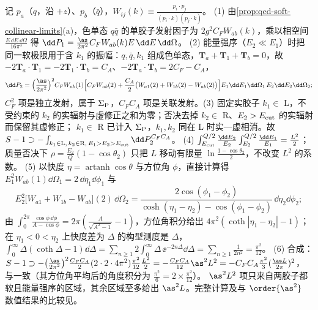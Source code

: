 \begin{proofsketch}
记 $p_a$（$q$，沿 $+z$）、$p_b$（$\bar q$），$W_{ij}(k)\equiv\frac{p_i\cdot p_j}{(p_i\cdot k)(p_j\cdot k)}$。
(1) 由\cref{prop:qcd-soft-collinear-limits}(a)，色单态 $q\bar q$ 的单胶子发射因子为 $2g^2C_FW_{ab}(k)$，乘以相空间 $\frac{E\,\dd E\,\dd\Omega}{16\pi^3}$ 得 $\dd P_1=\frac{\as}{2\pi^2}C_FW_{ab}(k)E\,\dd E\,\dd\Omega$。
(2) 能量强序（$E_2\ll E_1$）时把同一软极限用于含 $k_1$ 的振幅：$q,\bar q,k_1$ 组成色单态，$\bm T_a+\bm T_1+\bm T_b=0$，故 $-2\bm T_a\cdot\bm T_1=-2\bm T_1\cdot\bm T_b=C_A$、$-2\bm T_a\cdot\bm T_b=2C_F-C_A$，
\[
\dd P_2=\Big(\frac{\as}{2\pi^2}\Big)^2C_FW_{ab}(1)\Big[C_FW_{ab}(2)+\frac{C_A}{2}\big(W_{a1}(2)+W_{1b}(2)-W_{ab}(2)\big)\Big]E_1\dd E_1\dd\Omega_1\,E_2\dd E_2\dd\Omega_2 ;
\]
$C_F^2$ 项是独立发射，属于 $\Sigma_{\rm P}$，$C_FC_A$ 项是关联发射。(3) 固定实胶子 $k_1\in$ L，不受约束的 $k_2$ 的实辐射与虚修正之和为零；否决去掉 $k_2\in$ R、$E_2>E_{\rm cut}$ 的实辐射而保留其虚修正；
$k_1\in$ R 已计入 $\Sigma_{\rm P}$，$k_1,k_2$ 同在 L 时实—虚相消。故 $S-1\supset-\int_{k_1\in{\rm L},\,k_2\in{\rm R},\,E_1>E_2>E_{\rm cut}}\dd P_2^{C_FC_A}$。
(4) $\int_{E_{\rm cut}}^{Q/2}\frac{\dd E_2}{E_2}\int_{E_2}^{Q/2}\frac{\dd E_1}{E_1}=\frac{L^2}{2}$；质量否决下 $\rho=\frac{E_2}{Q}(1-\cos\theta_2)$ 只把 $L$ 移动有限量 $\ln\frac{1-\cos\theta_2}{2}$，不改变 $L^2$ 的系数。
(5) 以快度 $\eta=\operatorname{artanh}\cos\theta$ 与方位角 $\phi$，直接计算得 $E_1^2W_{ab}(1)\dd\Omega_1=2\,\dd\eta_1\dd\phi_1$ 与
\[
E_2^2\big[W_{a1}+W_{1b}-W_{ab}\big](2)\,\dd\Omega_2=\frac{2\cos(\phi_1-\phi_2)}{\cosh(\eta_1-\eta_2)-\cos(\phi_1-\phi_2)}\,\dd\eta_2\dd\phi_2 ;
\]
由 $\int_0^{2\pi}\frac{\cos\phi\,\dd\phi}{A-\cos\phi}=2\pi(\frac{A}{\sqrt{A^2-1}}-1)$，方位角积分给出 $4\pi^2(\coth|\eta_1-\eta_2|-1)$；在 $\eta_1<0<\eta_2$ 上快度差为 $\Delta$ 的构型测度是 $\Delta$，
$\int_0^\infty\Delta(\coth\Delta-1)\dd\Delta=\sum_{n\ge1}2\int_0^\infty\Delta\,\ee^{-2n\Delta}\dd\Delta=\sum_{n\ge1}\frac{1}{2n^2}=\frac{\pi^2}{12}$。
(6) 合成：$S-1\supset-\big(\frac{\as}{2\pi^2}\big)^2\frac{C_FC_A}{2}(2\cdot2\cdot4\pi^2)\frac{\pi^2}{12}\frac{L^2}{2}=-\frac{C_FC_A}{12}\as^2L^2=-C_FC_A\frac{\pi^2}{3}(\frac{\as L}{2\pi})^2$，
与\cite[式~(11)]{DasguptaSalam2001}一致（其方位角平均后的角度积分为 $\frac{\pi^2}{6}=2\times\frac{\pi^2}{12}$）。
$\as^2L^2$ 项只来自两胶子都软且能量强序的区域，其余区域至多给出 $\as^2L$。完整计算及与 $\order{\as^2}$ 数值结果的比较见\cite[第~2、4~节]{DasguptaSalam2001}。
\end{proofsketch}

